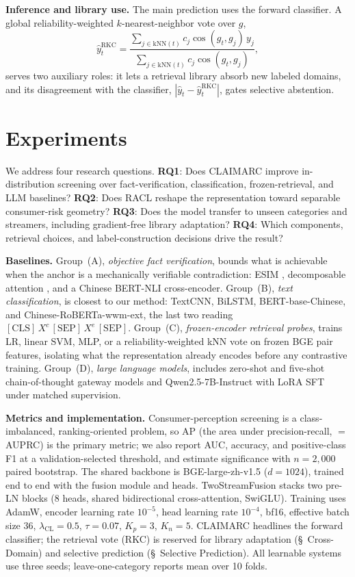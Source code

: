 \documentclass[letterpaper]{article}
\begin{document}
\textbf{Inference and library use.} The main prediction uses the forward classifier. A global reliability-weighted $k$-nearest-neighbor vote over $g$,
\begin{equation}
\hat y^{\mathrm{RKC}}_t=\frac{\sum_{j\in\mathrm{kNN}(t)} c_j\cos(g_t,g_j)\,y_j}{\sum_{j\in\mathrm{kNN}(t)} c_j\cos(g_t,g_j)},
\end{equation}
serves two auxiliary roles: it lets a retrieval library absorb new labeled domains, and its disagreement with the classifier, $|\hat y_t-\hat y^{\mathrm{RKC}}_t|$, gates selective abstention.

\section{Experiments}

We address four research questions. \textbf{RQ1}: Does CLAIMARC improve in-distribution screening over fact-verification, classification, frozen-retrieval, and LLM baselines? \textbf{RQ2}: Does RACL reshape the representation toward separable consumer-risk geometry? \textbf{RQ3}: Does the model transfer to unseen categories and streamers, including gradient-free library adaptation? \textbf{RQ4}: Which components, retrieval choices, and label-construction decisions drive the result?

\textbf{Baselines.} Group~(A), \emph{objective fact verification}, bounds what is achievable when the anchor is a mechanically verifiable contradiction: ESIM \citep{chen2017esim}, decomposable attention \citep{parikh2016decomp}, and a Chinese BERT-NLI cross-encoder. Group~(B), \emph{text classification}, is closest to our method: TextCNN, BiLSTM, BERT-base-Chinese, and Chinese-RoBERTa-wwm-ext, the last two reading $[\mathrm{CLS}]\,X^c\,[\mathrm{SEP}]\,X^e\,[\mathrm{SEP}]$. Group~(C), \emph{frozen-encoder retrieval probes}, trains LR, linear SVM, MLP, or a reliability-weighted kNN vote on frozen BGE pair features, isolating what the representation already encodes before any contrastive training. Group~(D), \emph{large language models}, includes zero-shot and five-shot chain-of-thought gateway models and Qwen2.5-7B-Instruct with LoRA SFT under matched supervision.

\textbf{Metrics and implementation.} Consumer-perception screening is a class-imbalanced, ranking-oriented problem, so AP (the area under precision-recall, $=$ AUPRC) is the primary metric; we also report AUC, accuracy, and positive-class F1 at a validation-selected threshold, and estimate significance with $n{=}2{,}000$ paired bootstrap. The shared backbone is BGE-large-zh-v1.5 ($d{=}1024$), trained end to end with the fusion module and heads. TwoStreamFusion stacks two pre-LN blocks (8 heads, shared bidirectional cross-attention, SwiGLU). Training uses AdamW, encoder learning rate $10^{-5}$, head learning rate $10^{-4}$, bf16, effective batch size 36, $\lambda_{\mathrm{CL}}{=}0.5$, $\tau{=}0.07$, $K_p{=}3$, $K_n{=}5$. CLAIMARC headlines the forward classifier; the retrieval vote (RKC) is reserved for library adaptation (\S~Cross-Domain) and selective prediction (\S~Selective Prediction). All learnable systems use three seeds; leave-one-category reports mean over 10 folds.
\end{document}
